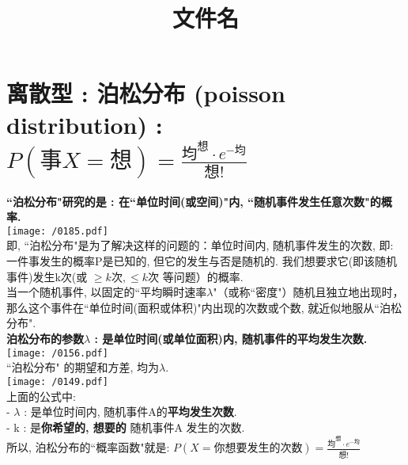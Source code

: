 \documentclass[UTF8]{ctexart}
\title{文件名}
\begin{document}
	\tableofcontents %
	\date{} %
	\maketitle  %
	
\section{离散型 : 泊松分布 (poisson distribution) : \\  $	P\left( \text{事}X=\text{想} \right) =\frac{\text{均}^{\text{想}}\cdot e^{-\text{均}}}{\text{想!}}	$}
	
	\textbf{``泊松分布"研究的是 : 在``单位时间(或空间)"内, ``随机事件发生任意次数"的概率.} \\
	
	\texttt{[image: /0185.pdf]} \\
	
	即, ``泊松分布"是为了解决这样的问题的：单位时间内, 随机事件发生的次数, 即: 一件事发生的概率P是已知的, 但它的发生与否是随机的. 我们想要求它(即该随机事件)发生k次(或 $\geq k \text{次}, \leq k \text{次}$  等问题）的概率. \\
	
	当一个随机事件, 以固定的``平均瞬时速率$\lambda$"（或称``密度"）随机且独立地出现时，那么这个事件在``单位时间(面积或体积)"内出现的次数或个数, 就近似地服从``泊松分布". \\
	\textbf{泊松分布的参数$\lambda$ : 是单位时间(或单位面积)内, 随机事件的平均发生次数.} \\
	
	\texttt{[image: /0156.pdf]} \\
	
	``泊松分布" 的期望和方差, 均为$\lambda$. \\
	
	
	
	
	\texttt{[image: /0149.pdf]} \\
	上面的公式中:  \\
	- $\lambda$ : 是单位时间内, 随机事件A的\textbf{平均发生次数}. \\
	- k : 是\textbf{你希望的, 想要的} 随机事件A 发生的次数. \\
	
	
	所以, 泊松分布的``概率函数"就是: $\boxed{
		P\left(X=\text{你想要发生的次数} \right) =\frac{\text{均}^{\text{想}}\cdot e^{-\text{均}}}{\text{想!}}
	}$ \\
\end{document}
